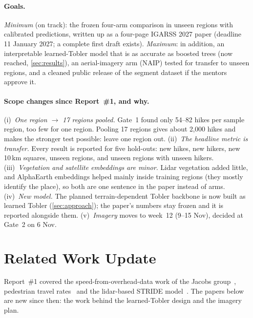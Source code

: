 \documentclass[10pt,twocolumn,letterpaper]{article}
\begin{document}
\paragraph{Goals.} \emph{Minimum} (on track): the frozen four-arm comparison in unseen regions with calibrated predictions, written up as a four-page IGARSS 2027 paper (deadline 11 January 2027; a complete first draft exists). \emph{Maximum}: in addition, an interpretable learned-Tobler model that is as accurate as boosted trees (now reached, \cref{sec:results}), an aerial-imagery arm (NAIP) tested for transfer to unseen regions, and a cleaned public release of the segment dataset if the mentors approve it.

\paragraph{Scope changes since Report~\#1, and why.}
(i)~\emph{One region $\to$ 17 regions pooled.} Gate~1 found only 54--82 hikes per sample region, too few for one region. Pooling 17 regions gives about 2{,}000 hikes and makes the stronger test possible: leave one region out.
(ii)~\emph{The headline metric is transfer.} Every result is reported for five hold-outs: new hikes, new hikers, new 10\,km squares, unseen regions, and unseen regions with unseen hikers.
(iii)~\emph{Vegetation and satellite embeddings are minor.} Lidar vegetation added little, and AlphaEarth embeddings helped mainly inside training regions (they mostly identify the place), so both are one sentence in the paper instead of arms.
(iv)~\emph{New model.} The planned terrain-dependent Tobler backbone is now built as learned Tobler (\cref{sec:approach}); the paper's numbers stay frozen and it is reported alongside them.
(v)~\emph{Imagery} moves to week~12 (9--15 Nov), decided at Gate~2 on 6 Nov.

\section{Related Work Update}
\label{sec:related}

Report~\#1 covered the speed-from-overhead-data work of the Jacobs group~\cite{hadzic2020rasternet,workman2020dynamic,workman2024probabilistic}, pedestrian travel rates~\cite{asako2024hikingtte,campbell2022variability} and the lidar-based STRIDE model~\cite{campbell2024stride,cutler2026machine}. The papers below are new since then: the work behind the learned-Tobler design and the imagery plan.
\end{document}
